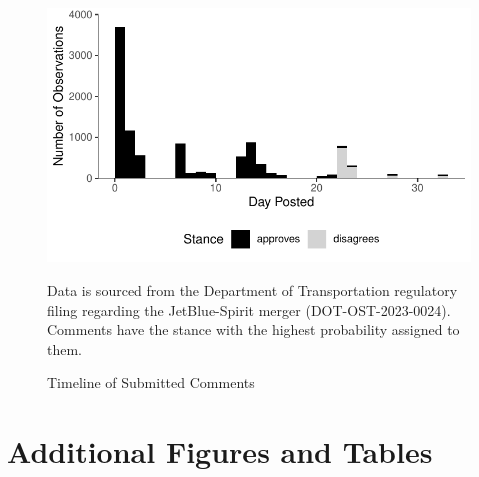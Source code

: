 \documentclass{article}
\begin{document}
\begin{appendices}
    \begin{figure}[h]
		\caption{Timeline of Submitted Comments}
		\label{fig:CommentTimeline}
        \begin{center}
    	\includegraphics{stance_submission_timeline}
        \end{center}
		\begin{minipage}{\textwidth} 
			{\footnotesize Data is sourced from the Department of Transportation regulatory filing regarding the JetBlue-Spirit merger  (DOT-OST-2023-0024). Comments have the stance with the highest probability assigned to them.} 
		\end{minipage}
	\end{figure}
	
	
	\FloatBarrier
	\pagebreak
	\section{Additional Figures and Tables}	
    \setcounter{table}{0}
    \setcounter{figure}{0}
	\FloatBarrier


\end{appendices}
\end{document}
